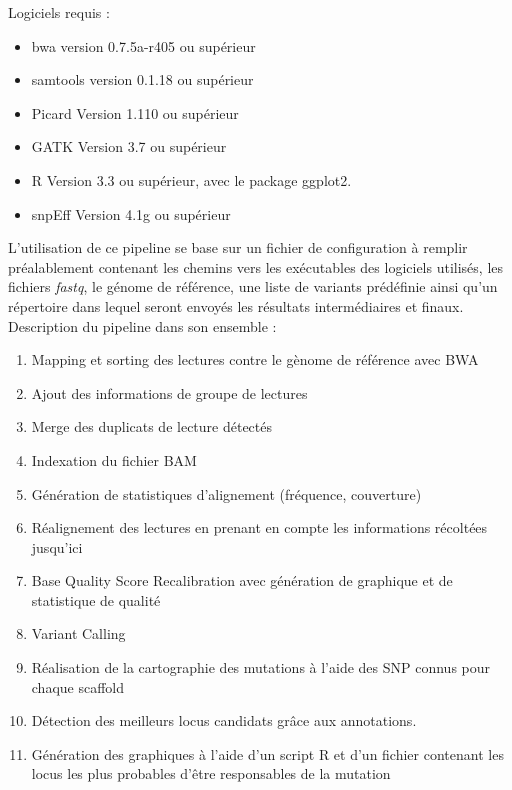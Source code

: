 \documentclass[12pt]{article}
\begin{document}
Logiciels requis :

\begin{itemize}
\item bwa version 0.7.5a-r405 ou supérieur
\item samtools version 0.1.18 ou supérieur
\item Picard Version 1.110 ou supérieur
\item GATK Version 3.7 ou supérieur
\item R Version 3.3 ou supérieur, avec le package ggplot2.
\item snpEff Version 4.1g ou supérieur
\end{itemize}


L'utilisation de ce pipeline se base sur un fichier de configuration à remplir préalablement contenant les chemins vers les exécutables des logiciels utilisés, les fichiers \textit{fastq}, le génome de référence, une liste de variants prédéfinie ainsi qu'un répertoire dans lequel seront envoyés les résultats intermédiaires et finaux.\\

Description du pipeline dans son ensemble :
\begin{enumerate}

\item Mapping et sorting des lectures contre le gènome de référence avec BWA
\item Ajout des informations de groupe de lectures
\item Merge des duplicats de lecture détectés
\item Indexation du fichier BAM
\item Génération de statistiques d'alignement (fréquence, couverture)
\item Réalignement des lectures en prenant en compte les informations récoltées jusqu'ici
\item Base Quality Score Recalibration avec génération de graphique et de statistique de qualité
\item Variant Calling
\item Réalisation de la cartographie des mutations à l'aide des SNP connus pour chaque scaffold
\item Détection des meilleurs locus candidats grâce aux annotations.
\item Génération des graphiques à l'aide d'un script R et d'un fichier contenant les locus les plus probables d'être responsables de la mutation
\end{enumerate}
\end{document}

